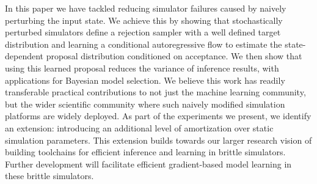 In this paper we have tackled reducing simulator failures caused by naively perturbing the input state.
We achieve this by showing that stochastically perturbed simulators define a rejection sampler with a well defined target distribution and learning a conditional autoregressive flow to estimate the state-dependent proposal distribution conditioned on acceptance.
We then show that using this learned proposal reduces the variance of inference results, with applications for Bayesian model selection.
We believe this work has readily transferable practical contributions to not just the machine learning community, but the wider scientific community where such naively modified simulation platforms are widely deployed.
As part of the experiments we present, we identify an extension: introducing an additional level of amortization over static simulation parameters.
This extension builds towards our larger research vision of building toolchains for efficient inference and learning in brittle simulators.
Further development will facilitate efficient gradient-based model learning in these brittle simulators.